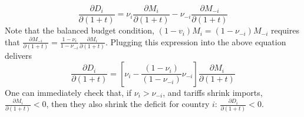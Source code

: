 \documentclass[12pt]{article}
\begin{document}
\[
\frac{\partial D_{i}}{\partial(1+t)}=\nu_{i}\frac{\partial M_{i}}{\partial(1+t)}-\nu_{-i}\frac{\partial M_{-i}}{\partial(1+t)}
\]
Note that the balanced budget condition, $(1-v_{i})M_{i}=(1-\nu_{-i})M_{-i}$ requires that $\frac{\partial M_{-i}}{\partial(1+t)}=\frac{1-\nu_{i}}{1-\nu_{-i}}\frac{\partial M_{i}}{\partial(1+t)}$. Plugging this expression into the above equation delivers
\[
\frac{\partial D_{i}}{\partial(1+t)}=\left[\nu_{i}-\frac{(1-\nu_{i})}{(1-\nu_{-i})}\nu_{-i}\right]\frac{\partial M_{i}}{\partial(1+t)}
\]
One can immediately check that, if $\nu_i>\nu_{-i}$, and tariffs shrink imports, $\frac{\partial M_{i}}{\partial(1+t)}<0$, then they also shrink the deficit for country $i$: $\frac{\partial D_{i}}{\partial(1+t)}<0$.
\end{document}
